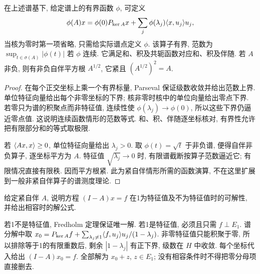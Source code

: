 \begin{proposition}\label{prop:calculus}
在上述谱基下, 给定谱上的有界函数 $\phi$, 可定义
\[
\phi(A)x=\phi(0)P_{\ker A}x+\sum_j\phi(\lambda_j)\langle x,u_j\rangle u_j,
\]
当核为零时第一项省略, 只需给实际谱点定义 $\phi$. 该算子有界, 范数为 $\sup_{t\in\sigma(A)}|\phi(t)|$ 若 $\phi$ 连续. 它满足和、积及共轭函数对应和、积及伴随. 若 $A$ 非负, 则有非负自伴平方根 $A^{1/2}$, 它紧且 $(A^{1/2})^2=A$.
\end{proposition}
\begin{proof}
在每个正交坐标上乘一个有界标量, Parseval 保证级数收敛并给出范数上界. 单位特征向量给出每个非零坐标的下界; 核非零时核中的单位向量给出零点下界. 若零只为谱的积聚点而非特征值, 连续性使 $\phi(\lambda_j)\to\phi(0)$, 所以这些下界仍逼近零点值. 这说明连续函数情形的范数等式. 和、积、伴随逐坐标核对, 有界性允许把有限部分和的等式取极限.

若 $\langle Ax,x\rangle\ge0$, 单位特征向量给出 $\lambda_j>0$. 取 $\phi(t)=\sqrt t$ 于非负谱, 便得自伴非负算子, 逐坐标平方为 $A$. 特征值 $\sqrt{\lambda_j}\to0$ 时, 有限谱截断按算子范数逼近它; 有限情况直接有限秩. 因而平方根紧. 此为紧自伴情形所需的函数演算, 不在这里扩展到一般非紧自伴算子的谱测度理论.
\end{proof}

\begin{exercise}\label{legacy:ch11:exercise1}
给定紧自伴 $A$, 说明方程 $(I-A)x=f$ 在1为特征值及不为特征值时的可解性, 并给出相容时的解公式.
\end{exercise}
\begin{solution}
若1不是特征值, Fredholm 定理保证唯一解. 若1是特征值, 必须且只需 $f\perp E_1$. 谱分解中取 $x_0=P_{\ker A}f+\sum_{\lambda_j\ne1}\langle f,u_j\rangle u_j/(1-\lambda_j)$. 非零特征值只能积聚于零, 所以排除等于1的有限重数后, 剩余 $|1-\lambda_j|$ 有正下界, 级数在 $H$ 中收敛. 每个坐标代入给出 $(I-A)x_0=f$. 全部解为 $x_0+z$, $z\in E_1$; 没有相容条件时不得把零分母项直接删去.
\end{solution}
